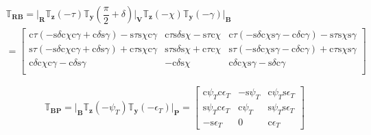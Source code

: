 \begin{multline} \label{eq:RBtrans}
\mathbb{T}_{\mathbf{RB}}=\Bigg|_{\mathbf{R}}\mathbb{T}_{\mathbf{z}}\left(-\tau\right)\mathbb{T}_{\mathbf{y}}\left(\dfrac{\pi}{2}+\delta\right)\Bigg|_{\mathbf{V}}\mathbb{T}_{\mathbf{z}}\left(-\chi\right)\mathbb{T}_{\mathbf{y}}\left(-\gamma\right)\Bigg|_{\mathbf{B}}\\
=
\begin{bmatrix}
\text{c}\tau\left(-\text{s}\delta \text{c}\chi \text{c}\gamma +\text{c}\delta \text{s}\gamma \right)-\text{s}\tau \text{s}\chi \text{c}\gamma  & \text{c}\tau \text{s}\delta \text{s}\chi -\text{s}\tau \text{c}\chi & \text{c}\tau\left(-\text{s}\delta \text{c}\chi \text{s}\gamma -\text{c}\delta \text{c}\gamma \right)-\text{s}\tau \text{s}\chi \text{s}\gamma \\
\text{s}\tau\left(-\text{s}\delta \text{c}\chi \text{c}\gamma +\text{c}\delta \text{s}\gamma \right)+\text{c}\tau \text{s}\chi \text{c}\gamma  & \text{s}\tau \text{s}\delta \text{s}\chi +\text{c}\tau \text{c}\chi & \text{s}\tau\left(-\text{s}\delta \text{c}\chi \text{s}\gamma -\text{c}\delta \text{c}\gamma \right)+\text{c}\tau \text{s}\chi \text{s}\gamma \\
\text{c}\delta \text{c}\chi \text{c}\gamma -\text{c}\delta \text{s}\gamma  & -\text{c}\delta \text{s}\chi &  \text{c}\delta \text{c}\chi \text{s}\gamma -\text{s}\delta \text{c}\gamma \\
\end{bmatrix}
\end{multline}



\begin{equation} \label{eq:BPtrans}
\mathbb{T}_{\mathbf{BP}}=\Bigg|_{\mathbf{B}}\mathbb{T}_{\mathbf{z}}\left(-\psi_{T}\right)\mathbb{T}_{\mathbf{y}}\left(-\epsilon_{T}\right)\Bigg|_{\mathbf{P}}=
\begin{bmatrix}
\text{c}\psi_{T}\text{c}\epsilon_{T} & -\text{s}\psi_{T} & \text{c}\psi_{T}\text{s}\epsilon_{T}\\
\text{s}\psi_{T}\text{c}\epsilon_{T} & \text{c}\psi_{T} & \text{s}\psi_{T}\text{s}\epsilon_{T}\\
-\text{s}\epsilon_{T} & 0 & \text{c}\epsilon_{T}
\end{bmatrix}
\end{equation}



